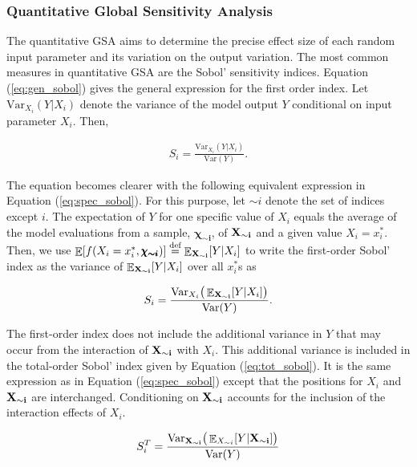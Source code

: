 \documentclass[a4paper,12pt]{article}
\DeclareMathOperator*{\E}{\mathbb{E}}
\newcommand*{\defeq}{\stackrel{\text{def}}{=}}
\begin{document}
\subsubsection{Quantitative Global Sensitivity Analysis}

The quantitative GSA aims to determine the precise effect size of each random input parameter and its variation on the output variation. The most common measures in quantitative GSA are the Sobol' sensitivity indices. Equation (\ref{eq:gen_sobol}) gives the general expression for the first order index. Let $\text{Var}_{X_i} (Y|X_i)$ denote the variance of the model output $Y$ conditional on input parameter $X_i$. Then,

\begin{align} \label{eq:gen_sobol}
S_i = \frac{\text{Var}_{X_i}(Y|X_i)}{\text{Var}(Y)}.
\end{align}

\noindent
The equation becomes clearer with the following equivalent expression in Equation (\ref{eq:spec_sobol}).
For this purpose, let $\sim i$ denote the set of indices except $i$. The expectation of $Y$ for one specific value of $X_i$ equals the average of the model evaluations from a sample, $\pmb{\chi_{\sim i}}$,  of $\bold{X_{\sim i}}$ and a given value
$X_i = x_i^*$. Then, we use $\E[f(X_i = x_i^*,\pmb{\chi_{\sim i}} )] \defeq \E_{\bold{X_{\sim i}}} [Y|X_i ]$ to write the first-order Sobol' index as the variance of $\E_{\bold{X_{\sim i}}} [Y|X_i ]$ over all $x_i^*$s as


\begin{align} \label{eq:spec_sobol}
S_i = \frac{\text{Var}_{X_i}\big( \E_{\bold{X_{\sim i}}} [Y|X_i ]\big)}{\text{Var}(Y)}.
\end{align}


\noindent
The first-order index does not include the additional variance in $Y$ that may occur from the interaction of $\bold{X_{\sim i}}$ with $X_i$. This additional variance is included in the total-order Sobol' index given by Equation (\ref{eq:tot_sobol}). It is the same expression as in Equation (\ref{eq:spec_sobol}) except that the positions for $X_i$ and $\bold{X_{\sim i}}$ are interchanged. Conditioning on $\bold{X_{\sim i}}$ accounts for the inclusion of the interaction effects of $X_i$.


\begin{align} \label{eq:tot_sobol}
S_{i}^T = \frac{\text{Var}_{\bold{X_{\sim i}}}\big( \E_{X_{\sim i}}[Y|\bold{X_{\sim i}]} \big)}{\text{Var}(Y)}
\end{align}
\end{document}
